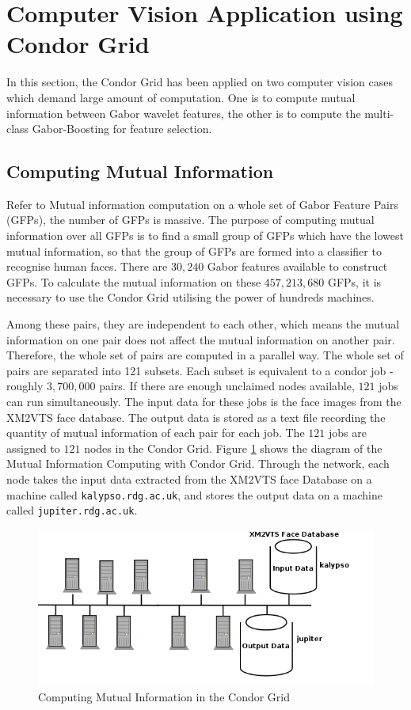 \section{Computer Vision Application using Condor Grid}\label{sec:gridapps}
In this section, the Condor Grid has been applied on two computer vision cases which demand large amount of computation. One is to compute mutual information between Gabor wavelet features, the other is to compute the multi-class Gabor-Boosting for feature selection.

\subsection{Computing Mutual Information}
Refer to Mutual information computation on a whole set of Gabor Feature Pairs (GFPs), the number of GFPs is massive. The purpose of computing mutual information over all GFPs is to find a small group of GFPs which have the lowest mutual information, so that the group of GFPs are formed into a classifier to recognise human faces. There are $30,240$ Gabor features available to construct GFPs. To calculate the mutual information on these $457,213,680$ GFPs, it is necessary to use the Condor Grid utilising the power of hundreds machines.

Among these pairs, they are independent to each other, which means the mutual information on one pair does not affect the mutual information on another pair. Therefore, the whole set of pairs are computed in a parallel way. The whole set of pairs are separated into 121 subsets. Each subset is equivalent to a condor job - roughly $3,700,000$ pairs. If there are enough unclaimed nodes available, $121$ jobs can run simultaneously. The input data for these jobs is the face images from the \mbox{XM2VTS} face database. The output data is stored as a text file recording the quantity of mutual information of each pair for each job. The $121$ jobs are assigned to $121$ nodes in the Condor Grid. \mbox{Figure} \ref{fig:mutCondor} shows the diagram of the Mutual Information Computing with Condor Grid. Through the network, each node takes the input data extracted from the \mbox{XM2VTS} face Database on a machine called \verb|kalypso.rdg.ac.uk|, and stores the output data on a machine called \verb|jupiter.rdg.ac.uk|.
\begin{figure}[ht]
 \includegraphics[width=\columnwidth]{ch5/figures/mutCondor.png}
\caption{Computing Mutual Information in the Condor Grid}
\label{fig:mutCondor}
\end{figure} 

